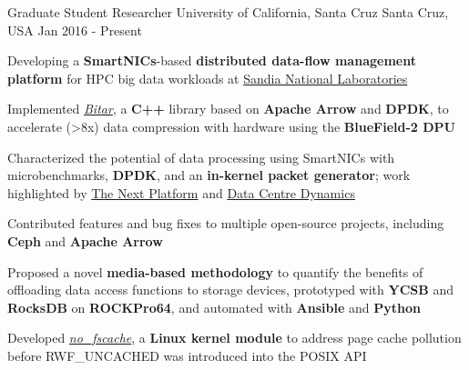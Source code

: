 

\begin{cventries}

  \cventry
    {Graduate Student Researcher} %
    {University of California, Santa Cruz} %
    {Santa Cruz, USA} %
    {Jan 2016 - Present} %
    {
      \begin{cvitems} %
        \item {Developing a \textbf{SmartNICs}-based \textbf{distributed data-flow management platform} for HPC big data workloads at \href{https://www.sandia.gov/}{Sandia National Laboratories}}
        \item {Implemented \href{https://github.com/ljishen/bitar}{\textit{Bitar}}, a \textbf{C++} library based on \textbf{Apache Arrow} and \textbf{DPDK}, to accelerate (\textgreater 8x) data compression with hardware using the \textbf{BlueField-2 DPU}}
        \item {Characterized the potential of data processing using SmartNICs with microbenchmarks, \textbf{DPDK}, and an \textbf{in-kernel packet generator}; work highlighted by \href{https://www.nextplatform.com/2021/05/24/testing-the-limits-of-the-bluefield-2-smartnic/}{The Next Platform} and \href{https://www.datacenterdynamics.com/en/news/intel-pitches-infrastructure-processing-unit-as-new-data-center-dpu/}{Data Centre Dynamics}}
        \item {Contributed features and bug fixes to multiple open-source projects, including \textbf{Ceph} and \textbf{Apache Arrow}}
        \item {Proposed a novel \textbf{media-based methodology} to quantify the benefits of offloading data access functions to storage devices, prototyped with \textbf{YCSB} and \textbf{RocksDB} on \textbf{ROCKPro64}, and automated with \textbf{Ansible} and \textbf{Python}}
        \item {Developed \href{https://github.com/ljishen/nofscache}{\textit{no\_fscache}}, a \textbf{Linux kernel module} to address page cache pollution before RWF\_UNCACHED was introduced into the POSIX API}
      \end{cvitems}
    }


\end{cventries}
